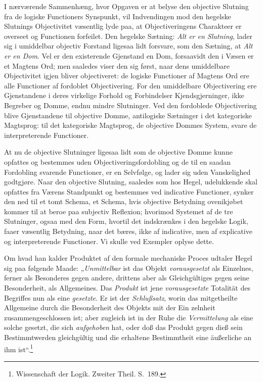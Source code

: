\documentclass[12pt]{book}
\newcommand{\opage}[1]{\marginnote{\footnotesize\textit{[#1]}}}
\begin{document}
I nærværende Sammenhæng, hvor Opgaven er at belyse den objective Slutning fra de logiske Functioners Synspunkt, vil Indvendingen mod den hegelske Slutnings Objectivitet væsentlig lyde paa, at Objectiveringens Charakteer er overseet og Functionen forfeilet. Den hegelske Sætning: \emph{Alt er en Slutning}, lader sig i umiddelbar objectiv Forstand
\opage{385}ligesaa lidt forsvare, som den Sætning, at \emph{Alt er en Dom}. Vel er den existerende Gjenstand en Dom, forsaavidt den i Væsen er et Magtens Ord; men saaledes viser den sig først, naar dens umiddelbare Objectivitet igjen bliver objectiveret: de logiske Functioner af Magtens Ord ere alle Functioner af fordoblet Objectivering. For den umiddelbare Objectivering ere Gjenstandene i deres virkelige Forhold og Forbindelser Kjendsgjerninger, ikke Begreber og Domme, endnu mindre Slutninger. Ved den fordoblede Objectivering blive Gjenstandene til objective Domme, antilogiske Sætninger i det kategoriske Magtsprog: til det kategoriske Magtsprog, de objective Dommes System, svare de interpreterende Functioner.

At nu de objective Slutninger ligesaa lidt som de objective Domme kunne opfattes og bestemmes uden Objectiveringsfordobling og de til en saadan Fordobling svarende Functioner, er en Selvfølge, og lader sig uden Vanskelighed godtgjøre. Naar den objective Slutning, saaledes som hos Hegel, udelukkende skal opfattes fra Værens Standpunkt og bestemmes ved indicative Functioner, synker den ned til et tomt Schema, et Schema, hvis objective Betydning ovenikjøbet kommer til at beroe paa subjectiv Reflexion; hvorimod Systemet af de tre Slutninger, ogsaa med den Form, hvortil det indskrænkes i den hegelske Logik, faaer væsentlig Betydning, naar det bæres, ikke af indicative, men af explicative og interpreterende Functioner. Vi skulle ved Exempler oplyse dette.

Om hvad han kalder Produktet af den formale mechaniske Proces udtaler Hegel sig paa følgende Maade: „\emph{Unmittelbar} ist das Objekt \emph{vorausgesetzt} als Einzelnes, ferner als Besonderes gegen andere, drittens aber als Gleichgültiges gegen seine Besonderheit, als Allgemeines. Das \emph{Produkt} ist jene \emph{vorausgesetzte} Totalität des Begriffes nun als eine \emph{gesetzte}. Er ist der \emph{Schlußsatz}, worin das mitgetheilte Allgemeine durch die Besonderheit des Objekts mit der Ein%
\opage{386}zelnheit zusammengeschlossen ist; aber zugleich ist in der Ruhe die \emph{Vermittelung} als eine solche gesetzt, die sich \emph{aufgehoben} hat, oder doß das Produkt gegen dieß sein Bestimmtwerden gleichgültig und die erhaltene Bestimmtheit eine äußerliche an ihm ist“.\footnote{Wissenschaft der Logik. Zweiter Theil. S.~189.}%
\end{document}
